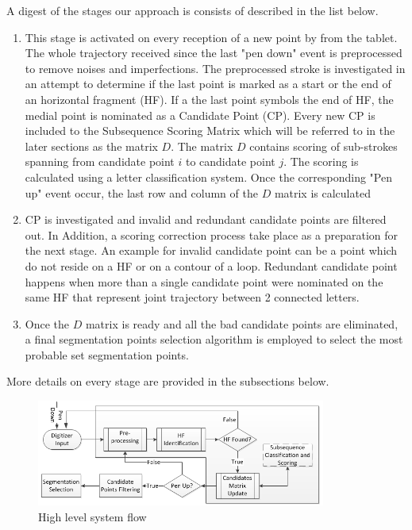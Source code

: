 \documentclass[journal,compsoc]{IEEEtran}
\begin{document}

A digest of the stages our approach is consists of described in the list below. 
\begin{enumerate}
  \item This stage is activated on every reception of a new point by from the tablet. The whole trajectory received since the last "pen down" event is preprocessed to remove noises and imperfections. The preprocessed stroke is investigated in an attempt to determine if the last point is marked as a start or the end of an horizontal fragment (HF). If a the last point symbols the end of HF, the medial point is nominated as a Candidate Point (CP). Every new CP is included to the Subsequence Scoring Matrix which will be referred to in the later sections as the matrix $D$. The matrix $D$ contains scoring of sub-strokes spanning from candidate point $i$ to candidate point $j$. The scoring is calculated using a letter classification system. Once the corresponding "Pen up" event occur, the last row and column of the $D$ matrix is calculated 
  \item CP is investigated and invalid and redundant candidate points are filtered out. In Addition, a scoring correction process take place as a preparation for the next stage. An example for invalid candidate point can be a point which do not reside on a HF or on a contour of a loop. Redundant candidate point happens when more than a single candidate point were nominated on the same HF  that represent joint trajectory between 2 connected letters.
  \item Once the $D$ matrix is ready and all the bad candidate points are eliminated, a final segmentation points selection algorithm is employed to select the most probable set segmentation points.
\end{enumerate}

More details on every stage are provided in the subsections below.

\begin{figure}
\centering
\includegraphics[width=9.5cm]{./figures/system_flow}
\caption{High level system flow}
\label{fig:system_flow}
\end{figure}
\end{document}

